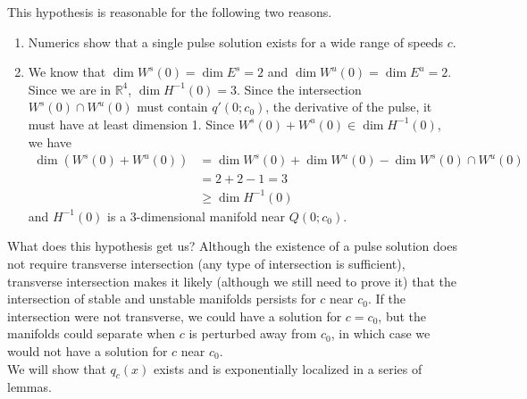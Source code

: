 \documentclass[12pt]{article}
\def\R{{\mathbb R}}
\begin{document}
This hypothesis is reasonable for the following two reasons.
\begin{enumerate}
	\item Numerics show that a single pulse solution exists for a wide range of speeds $c$.
	\item We know that $\dim W^s(0) = \dim E^s = 2$ and $\dim W^u(0) = \dim E^u = 2$. Since we are in $\R^4$, $\dim H^{-1}(0) = 3$. Since the intersection $W^s(0) \cap W^u(0)$ must contain $q'(0; c_0)$, the derivative of the pulse, it must have at least dimension 1. Since $W^s(0) + W^u(0) \in \dim H^{-1}(0)$, we have
	\begin{align*}
	\dim( W^s(0) + W^u(0) ) &= \dim W^s(0) + \dim W^u(0) - \dim W^s(0) \cap W^u(0) \\
	&= 2 + 2 - 1 = 3 \\
	&\geq \dim H^{-1}(0)
	\end{align*}
	and $H^{-1}(0)$ is a 3-dimensional manifold near $Q(0; c_0)$.
\end{enumerate}

What does this hypothesis get us? Although the existence of a pulse solution does not require transverse intersection (any type of intersection is sufficient), transverse intersection makes it likely (although we still need to prove it) that the intersection of stable and unstable manifolds persists for $c$ near $c_0$. If the intersection were not transverse, we could have a solution for $c = c_0$, but the manifolds could separate when $c$ is perturbed away from $c_0$, in which case we would not have a solution for $c$ near $c_0$.\\

We will show that $q_c(x)$ exists and is exponentially localized in a series of lemmas.\\
\end{document}
